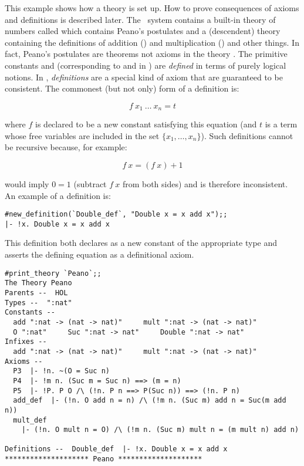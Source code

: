 This example shows how a theory is set up. How to prove consequences of axioms and
definitions is described later. The \HOL\ system contains a built-in
theory of numbers called  which contains Peano's postulates and a
(descendent)  theory  containing the definitions of addition
(\ml{+}) and multiplication (\ml{*}) and other things.
In fact, Peano's
postulates are theorems not axioms in the theory . The primitive constants
 and  (corresponding to  and  in ) are
{\it defined\/} in terms of purely logical notions.
In \HOL, {\it definitions\/} are a special kind of axiom that are
guaranteed to be consistent. The commonest (but not only) form of a definition is:

\[f\ x_1\ \ldots\ x_n = t\]

\noindent where $f$ is declared to be a new constant satisfying this
equation (and $t$ is a term whose free variables are included in the set
$\{x_1,\ldots,x_n\}$).  Such definitions cannot be recursive because, for
example:

\[ f\ x = (f\ x)+1 \]

\noindent would imply $0=1$ (subtract $f\ x$ from both sides)
and is therefore inconsistent. An example of a definition is:

\begin{session}\begin{verbatim}
#new_definition(`Double_def`, "Double x = x add x");;
|- !x. Double x = x add x
\end{verbatim}\end{session}

\noindent This definition both declares  as a new constant of the
appropriate type and asserts the defining equation as a definitional axiom.

\begin{session}\begin{verbatim}
#print_theory `Peano`;;
The Theory Peano
Parents --  HOL
Types --  ":nat"
Constants --
  add ":nat -> (nat -> nat)"     mult ":nat -> (nat -> nat)"
  O ":nat"     Suc ":nat -> nat"     Double ":nat -> nat"
Infixes --
  add ":nat -> (nat -> nat)"     mult ":nat -> (nat -> nat)"
Axioms --
  P3  |- !n. ~(O = Suc n)
  P4  |- !m n. (Suc m = Suc n) ==> (m = n)
  P5  |- !P. P O /\ (!n. P n ==> P(Suc n)) ==> (!n. P n)
  add_def  |- (!n. O add n = n) /\ (!m n. (Suc m) add n = Suc(m add n))
  mult_def
    |- (!n. O mult n = O) /\ (!m n. (Suc m) mult n = (m mult n) add n)

Definitions --  Double_def  |- !x. Double x = x add x
******************** Peano ********************
\end{verbatim}\end{session}


